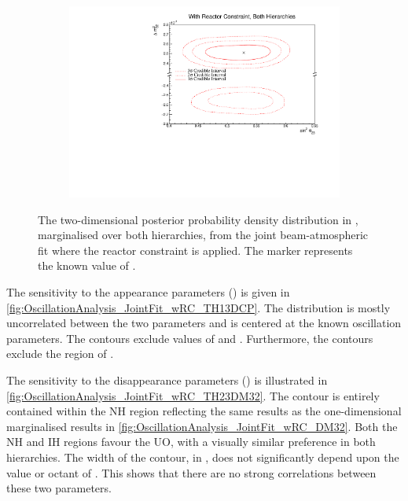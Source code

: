 \begin{figure}[h]
  \begin{subfigure}[t]{0.98\textwidth}
    \includegraphics[width=\textwidth, trim={0mm 0mm 0mm 0mm}, clip,page=1]{Figures/OA/JointFit_wRC/Contours_2D_th23_dm32_BH_1_wRC_UnSmeared_CredibleInterval.pdf}
  \end{subfigure}
  \caption{The two-dimensional posterior probability density distribution in , marginalised over both hierarchies, from the joint beam-atmospheric fit where the reactor constraint is applied. The marker represents the known value of .}
  \label{fig:OscillationAnalysis_JointFit_wRC_TH23DM32}
\end{figure}

The sensitivity to the appearance parameters () is given in \autoref{fig:OscillationAnalysis_JointFit_wRC_TH13DCP}. The distribution is mostly uncorrelated between the two parameters and is centered at the known oscillation parameters. The \quickmath{1\sigma} contours exclude values of  and . Furthermore, the \quickmath{3\sigma} contours exclude the region of .

The sensitivity to the disappearance parameters () is illustrated in \autoref{fig:OscillationAnalysis_JointFit_wRC_TH23DM32}. The \quickmath{1\sigma} contour is entirely contained within the NH region reflecting the same results as the one-dimensional marginalised results in \autoref{fig:OscillationAnalysis_JointFit_wRC_DM32}. Both the NH and IH regions favour the UO, with a visually similar preference in both hierarchies. The width of the \quickmath{1\sigma} contour, in , does not significantly depend upon the value or octant of . This shows that there are no strong correlations between these two parameters.

